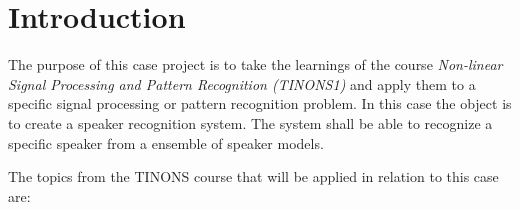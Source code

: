 \section*{Introduction}
The purpose of this case project is to take the learnings of the course \emph{Non-linear Signal Processing and Pattern Recognition (TINONS1)} and apply them to a specific signal processing or pattern recognition problem.
In this case the object is to create a speaker recognition system.
The system shall be able to recognize a specific speaker from a ensemble of speaker models.

The topics from the TINONS course that will be applied in relation to this case are:
		